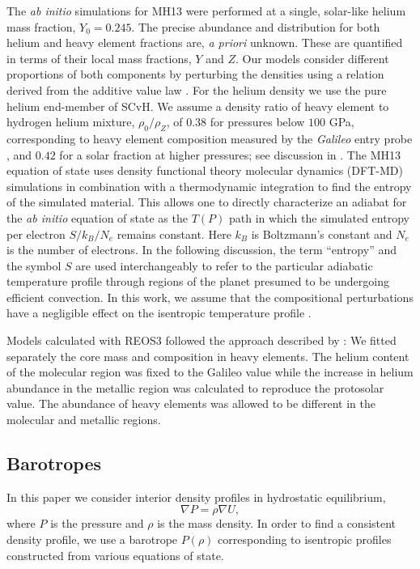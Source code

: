The \textit{ab initio} simulations for MH13 were performed at a single, solar-like
helium mass fraction, $Y_0=0.245$. The precise abundance and distribution for both
helium and heavy element fractions are, \textit{a priori} unknown.  These are
quantified in terms of their local mass fractions, $Y$ and  $Z$. Our models consider
different proportions of both components by perturbing the densities using a relation
derived from the additive value law \citep{hubbard2016}. For the helium density we
use the pure helium end-member of SCvH. We assume a density ratio of heavy element to
hydrogen helium mixture,  $\rho_0 / \rho_Z$, of  $0.38$ for pressures below $100$
GPa, corresponding to heavy element composition measured by the \textit{Galileo}
entry probe \citep{Wong2004}, and $0.42$ for a solar fraction at higher pressures;
see discussion in \citet{hubbard2016}.  
The MH13 equation of state  uses density functional theory molecular dynamics
(DFT-MD) simulations in combination with a thermodynamic integration to find the
entropy of the simulated material. This allows one to directly characterize an
adiabat for the \textit{ab initio} equation of state as the $T(P)$ path in which the
simulated entropy per electron $S/k_B/N_e$ remains constant.  Here $k_B$ is
Boltzmann's constant and $N_e$ is the number of electrons. In the following
discussion, the term ``entropy'' and the symbol $S$ are used interchangeably to refer
to the particular adiabatic temperature profile through regions of the planet
presumed to be undergoing efficient convection. In this work, we assume that the
compositional perturbations have a negligible effect on the isentropic temperature
profile \citep{Soubiran2016}.


Models calculated with REOS3 followed the approach described by
\citet{miguel2016}: We fitted separately the core mass and composition
in heavy elements. The helium content of the molecular region was
fixed to the Galileo value while the increase in helium abundance in
the metallic region was calculated to reproduce the protosolar
value. The abundance of heavy elements was allowed to be different in
the molecular and metallic regions.   


\subsection{Barotropes} \label{sec:barotropes}
In this paper we consider interior density profiles in hydrostatic equilibrium,
%
\begin{equation} \nabla P = \rho \nabla U,     
    \label{eq:hydrostatic} \end{equation}
%
where $P$ is the pressure and $\rho$ is the mass density. In order to find a consistent
density profile, we use a barotrope $P(\rho)$ corresponding to isentropic profiles
constructed from various equations of state. 

